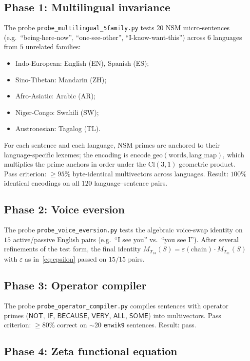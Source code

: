 \documentclass[11pt,a4paper]{article}
\theoremstyle{plain}
\theoremstyle{definition}
\theoremstyle{remark}
\numberwithin{equation}{section}
\providecommand{\Cl}{\mathrm{Cl}}
\providecommand{\eps}{\varepsilon}
\begin{document}
\subsection{Phase 1: Multilingual invariance}

The probe \texttt{probe\_multilingual\_5family.py} tests
$20$ NSM micro-sentences (e.g.\ ``being-here-now'', ``one-see-other'',
``I-know-want-this'') across $6$ languages from $5$ unrelated
families:
\begin{itemize}
\item Indo-European: English (EN), Spanish (ES);
\item Sino-Tibetan: Mandarin (ZH);
\item Afro-Asiatic: Arabic (AR);
\item Niger-Congo: Swahili (SW);
\item Austronesian: Tagalog (TL).
\end{itemize}
For each sentence and each language, NSM primes are anchored to
their language-specific lexemes; the encoding is
$\text{encode\_geo}(\text{words}, \text{lang\_map})$, which
multiplies the prime anchors in order under the $\Cl(3,1)$
geometric product.  Pass criterion: $\geq 95\%$ byte-identical
multivectors across languages.  Result: $100\%$ identical
encodings on all $120$ language--sentence pairs.

\subsection{Phase 2: Voice eversion}

The probe \texttt{probe\_voice\_eversion.py} tests the algebraic
voice-swap identity on $15$ active/passive English pairs (e.g.\
``I see you'' vs.\ ``you see I'').  After several refinements of
the test form, the final identity
$M_{T_{13}}(S) = \eps(\text{chain}) \cdot M_{T_{31}}(S)$ with
$\eps$ as in~\eqref{eq:epsilon} passed on $15/15$ pairs.

\subsection{Phase 3: Operator compiler}

The probe \texttt{probe\_operator\_compiler.py} compiles sentences
with operator primes ($\mathsf{NOT}$, $\mathsf{IF}$,
$\mathsf{BECAUSE}$, $\mathsf{VERY}$, $\mathsf{ALL}$, $\mathsf{SOME}$)
into multivectors.  Pass criterion: $\geq 80\%$ correct on $\sim 20$
\texttt{enwik9} sentences.  Result: pass.

\subsection{Phase 4: Zeta functional equation}
\end{document}
